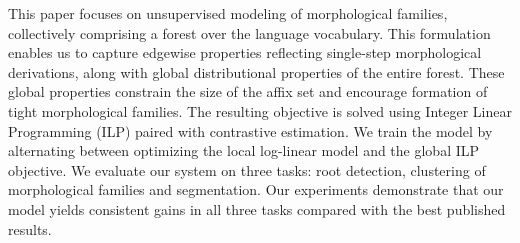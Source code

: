 This paper focuses on unsupervised modeling of morphological families, collectively comprising a forest over the language vocabulary. This formulation enables us to capture edgewise properties reflecting single-step morphological derivations, along with global distributional properties of the entire forest. These global properties constrain the size of the affix set and encourage formation of tight morphological families. The resulting objective is solved using Integer Linear Programming (ILP) paired with contrastive estimation. We train the model by alternating between optimizing the local log-linear model and the global ILP objective. We evaluate our system on three tasks{:} root detection, clustering of morphological families and segmentation. Our experiments demonstrate that our model yields consistent gains in all three tasks compared with the best published results.